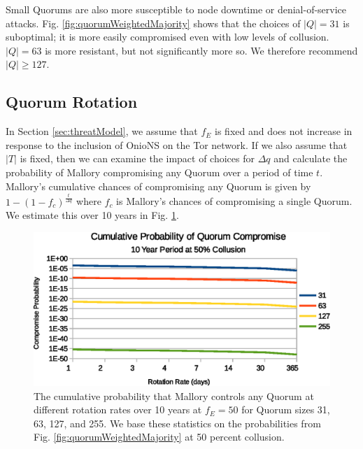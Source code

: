 \documentclass[USenglish,oneside,twocolumn]{article}
\begin{document}
Small Quorums are also more susceptible to node downtime or denial-of-service attacks. Fig. \ref{fig:quorumWeightedMajority} shows that the choices of $ \left\vert{Q}\right\vert = 31 $ is suboptimal; it is more easily compromised even with low levels of collusion. $ \left\vert{Q}\right\vert = 63 $ is more resistant, but not significantly more so. We therefore recommend $ \left\vert{Q}\right\vert \geq 127 $.

\subsection{Quorum Rotation}
\label{sec:qRotation}

In Section \ref{sec:threatModel}, we assume that $ f_{E} $ is fixed and does not increase in response to the inclusion of OnioNS on the Tor network. If we also assume that $ \left\vert{T}\right\vert $ is fixed, then we can examine the impact of choices for $ \Delta q $ and calculate the probability of Mallory compromising any Quorum over a period of time $ t $. Mallory's cumulative chances of compromising any Quorum is given by $ 1 - (1 - f_{c})^{\frac{t}{\Delta q}} $ where $ f_{c} $ is Mallory's chances of compromising a single Quorum. We estimate this over 10 years in Fig. \ref{fig:cumulativeProbability}.

\begin{figure}[h]
	\centering
	\includegraphics[width=\linewidth]{../assets/analysis/CumulativeMaliciousQuorumNew.eps}
	\caption{The cumulative probability that Mallory controls any Quorum at different rotation rates over 10 years at $ f_{E} = 50 $ for Quorum sizes 31, 63, 127, and 255. We base these statistics on the probabilities from Fig. \ref{fig:quorumWeightedMajority} at 50 percent collusion.}
	\label{fig:cumulativeProbability}
\end{figure}
\end{document}
